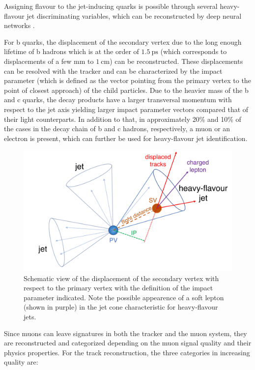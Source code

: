 
Assigning flavour to the jet-inducing quarks is possible through several heavy-flavour jet discriminating variables, which can be reconstructed by deep neural networks \cite{Sirunyan_2018}.

For b quarks, the displacement of the secondary vertex due to the long enough lifetime of b hadrons which is at the order of $\SI{1.5}{\pico\second}$ (which corresponds to displacements of a few mm to $\SI{1}{\centi\meter}$) can be reconstructed. These displacements can be resolved with the tracker and can be characterized by the impact parameter (which is defined as the vector pointing from the primary vertex to the point of closest approach) of the child particles. Due to the heavier mass of the b and c quarks, the decay products have a larger transversal momentum with respect to the jet axis yielding larger impact parameter vectors compared that of their light counterparts. In addition to that, in approximately 20\% and 10\% of the cases in the decay chain of b and c hadrons, respectively, a muon or an electron is present, which can further be used for heavy-flavour jet identification.

\begin{figure}[h!]
	\centering
	\includegraphics[width=0.6\linewidth]{figures/experiment/pvsv}
	\caption{Schematic view of the displacement of the secondary vertex with respect to the primary vertex with the definition of the impact parameter indicated. Note the possible appearence of a soft lepton (shown in purple) in the jet cone characteristic for heavy-flavour jets.}
	\label{fig:pvsv}
\end{figure}


Since muons can leave signatures in both the tracker and the muon system, they are reconstructed and categorized depending on the muon signal quality and their physics properties. For the track reconstruction, the three categories in increasing quality are: \cite{Collaboration_2010}

